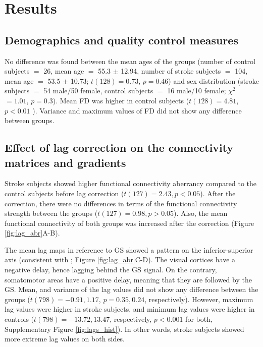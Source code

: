 \documentclass[fleqn,10pt]{wlscirep}
\begin{document}
\section*{Results}

\subsection*{Demographics and quality control measures}
No difference was found between the mean ages of the groups (number of control subjects $=$ 26, mean age $=$ 55.3 $\pm$ 12.94, number of stroke subjects $=$ 104, mean age $=$ 53.5 $\pm$ 10.73; $t(128) = 0.73$, $p = 0.46$) and sex distribution (stroke subjects $=$ 54 male/50 female, control subjects $=$ 16 male/10 female; $\chi^2$ $ = 1.01$, $p = 0.3$). Mean FD was higher in control subjects ($t(128) = 4.81$, $p < 0.01$ ). Variance and maximum values of FD did not show any difference between groups.

\subsection*{Effect of lag correction on the connectivity matrices and gradients}

Stroke subjects showed higher functional connectivity aberrancy compared to the control subjects before lag correction ($t(127) = 2.43, p < 0.05$). After the correction, there were no differences in terms of the functional connectivity strength between the groups ($t(127) = 0.98, p > 0.05$). Also, the mean functional connectivity of both groups was increased after the correction (Figure \ref{fig:lag_abr}A-B). 

The mean lag maps in reference to GS showed a pattern on the inferior-superior axis (consistent with \citet{tong2019low,erdougan2016correcting}; Figure \ref{fig:lag_abr}C-D). The visual cortices have a negative delay, hence lagging behind the GS signal. On the contrary, somatomotor areas have a positive delay, meaning that they are followed by the GS. Mean, and variance of the lag values did not show any difference between the groups ($t(798) = -0.91, 1.17$, $p = 0.35, 0.24$, respectively). However, maximum lag values were higher in stroke subjects, and minimum lag values were higher in controls ($t(798) = -13.72, 13.47$, respectively,  $p < 0.001$ for both, Supplementary Figure \ref{fig:lags_hist}). In other words, stroke subjects showed more extreme lag values on both sides. 
\end{document}
